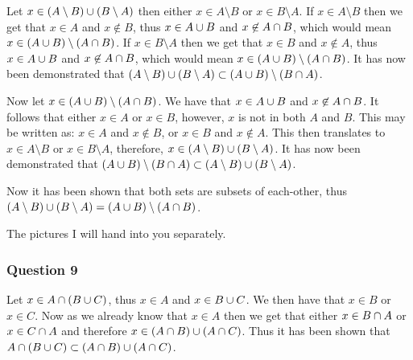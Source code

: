 \documentclass{article}
\begin{document}
Let $x \in (A\setminus B) \cup (B\setminus A)$ then either $x \in A \setminus B$ or $x \in B\setminus A$. If $x \in A\setminus B$ then we get that $x \in A$ and $x \not\in B$, thus $x \in A\cup B$ and $x \not\in A \cap B$, which would mean $x \in (A\cup B)\setminus(A\cap B)$. If $x\in B\setminus A$ then we get that $x\in B$ and $x\not\in A$, thus $x\in A \cup B$ and $x\not\in A\cap B$, which would mean $x \in (A\cup B)\setminus(A\cap B)$. It has now been demonstrated that $(A\setminus B) \cup (B\setminus A) \subset (A \cup B) \setminus (B\cap A)$.

Now let $x\in(A\cup B)\setminus(A\cap B)$. We have that $x \in A\cup B$ and $x \not\in A\cap B$. It follows that either $x \in A$ or $x\in B$, however, $x$ is not in both $A$ and $B$. This may be written as: $x \in A$ and $x \not\in B$, or $x\in B$ and $x\not\in A$. This then translates to $x \in A\setminus B$ or $x\in B\setminus A$, therefore, $x\in (A\setminus B) \cup (B\setminus A)$. It has now been demonstrated that $(A\cup B) \setminus (B\cap A) \subset (A\setminus B)\cup (B\setminus A)$.

Now it has been shown that both sets are subsets of each-other, thus $(A\setminus B)\cup(B\setminus A) = (A\cup B) \setminus (A\cap B)$.

The pictures I will hand into you separately.






\subsubsection{Question 9}

Let $x \in A \cap (B \cup C)$, thus $x \in A$ and $x\in B\cup C$. We then have that $x \in B$ or $x \in C$. Now as we already know that $x\in A$ then we get that either $x \in B \cap A$ or $x \in C \cap A$ and therefore $x \in (A\cap B) \cup (A \cap C)$. Thus it has been shown that $A \cap (B\cup C) \subset (A\cap B)\cup (A\cap C)$.
\end{document}
